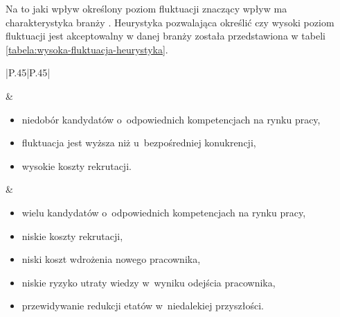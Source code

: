 Na to jaki wpływ określony poziom fluktuacji znaczący wpływ ma charakterystyka branży \cite{taylor-2006}.
Heurystyka pozwalająca określić czy wysoki poziom fluktuacji jest akceptowalny w danej branży została przedstawiona w tabeli \ref{tabela:wysoka-fluktuacja-heurystyka}.

\noindent\begin{minipage}{\textwidth}
             \begin{table}[H]
                 \raggedright\caption{Heurystyka do oceny wysokiego poziomu fluktuacji\label{tabela:wysoka-fluktuacja-heurystyka}}
                 \begin{center}
                     \begin{tabular}{|P{.45\textwidth}|P{.45\textwidth}|}

                         \hline
                          &
                          \\
                         \hline

                         \begin{itemize}
                             \item niedobór kandydatów o~odpowiednich kompetencjach na rynku pracy,
                             \item fluktuacja jest wyższa niż u~bezpośredniej konukrencji,
                             \item wysokie koszty rekrutacji.
                         \end{itemize} &
                         \begin{itemize}
                             \item wielu kandydatów o~odpowiednich kompetencjach na rynku pracy,
                             \item niskie koszty rekrutacji,
                             \item niski koszt wdrożenia nowego pracownika,
                             \item niskie ryzyko utraty wiedzy w~wyniku odejścia pracownika,
                             \item przewidywanie redukcji etatów w~niedalekiej przyszłości.
                         \end{itemize} \\
                         \hline
                     \end{tabular}
                 \end{center}
                 \raggedright{}
                 \vspace{0.75cm}
             \end{table}
\end{minipage}

